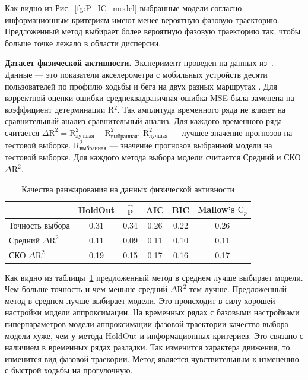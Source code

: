 \documentclass[article,14pt,subf,href,colorlinks=true
]{disser}
\begin{document}
Как видно из Рис.~\ref{fg:P_IC_model} выбранные модели согласно информационным критериям имеют менее вероятную фазовую траекторию.
Предложенный метод выбирает более вероятную фазовую траекторию так, чтобы больше точке лежало в области дисперсии.

\textbf{Датасет физической активности.}
Эксперимент проведен на данных из~\cite{Malekzadeh_2018}.
Данные --- это показатели акселерометра с мобильных устройств десяти пользователей по профилю ходьбы и бега на двух разных маршрутах .
Для корректной оценки ошибки среднеквадратичная ошибка MSE была заменена на коэффициент детерминации R$^2$.
Так амплитуда временного ряда не влияет на сравнительный анализ сравнительный анализ.
Для каждого временного ряда считается $\Delta \text{R}^2 = \text{R}^2_{\text{лучшая}} - \text{R}^2_{\text{выбранная}}$.
$\text{R}^2_{\text{лучшая}}$ --- лучшее значение прогнозов на тестовой выборке.
$\text{R}^2_{\text{выбранная}}$ --- значение прогнозов выбранной модели на тестовой выборке.
Для каждого метода выбора модели считается Средний и СКО $\Delta \text{R}^2$.

\begin{table}[H]
\caption{Качества ранжирования на данных физической активности}
\centering\medskip\tabcolsep=6pt
\label{tbl:rang_table}
\begin{tabular}{l|ccccc}
\hline
 &  HoldOut&  $\mathbf{\hat{\bar{p}}}$&  AIC &  BIC & Mallow's $\text{C}_p$\\
\hline 
Точность выбора            &   0.31 &  0.34 & 0.26 & 0.22 & 0.26 \\
Средний $\Delta \text{R}^2$&   0.11 &  0.09 & 0.11 & 0.10 & 0.11 \\
СКО $\Delta \text{R}^2$    &   0.19 &  0.15 & 0.17 & 0.16 & 0.17 \\
\hline
\end{tabular}
\end{table}

Как видно из таблицы~\ref{tbl:rang_table} предложенный метод в среднем лучше выбирает модели.
Чем больше точность и чем меньше средний $\Delta \text{R}^2$ тем лучше.
Предложенный метод в среднем лучше выбирает модели.
Это происходит в силу хорошей настройки модели аппроксимации.
На временных рядах с базовыми настройками гиперпараметров модели аппроксимации фазовой траектории качество выбора модели хуже, чем у метода HoldOut и информационных критериев.
Это связано с наличием в временных рядах разладки.
Так изменится характера движения, то изменится вид фазовой траекории.
Метод является чувствительным  к изменению с быстрой ходьбы на прогулочную.
\end{document}
